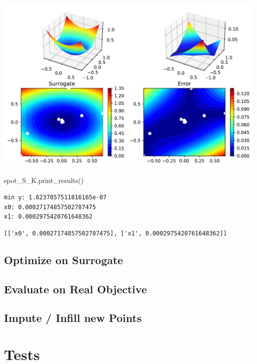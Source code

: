 \documentclass[
  letterpaper,
  DIV=11,
  numbers=noendperiod]{scrreprt}
\newenvironment{Shaded}{\begin{snugshade}}{\end{snugshade}}
\newcommand{\NormalTok}[1]{\textcolor[rgb]{0.00,0.23,0.31}{#1}}
\begin{document}
\includegraphics{012_num_spot_ei_files/figure-pdf/cell-40-output-1.pdf}

\begin{Shaded}
\begin{Highlighting}[]
\NormalTok{spot\_S\_K.print\_results()}
\end{Highlighting}
\end{Shaded}

\begin{verbatim}
min y: 1.6237857511816165e-07
x0: 0.00027174857502787475
x1: 0.0002975420761648362
\end{verbatim}

\begin{verbatim}
[['x0', 0.00027174857502787475], ['x1', 0.0002975420761648362]]
\end{verbatim}

\subsection{Optimize on Surrogate}\label{optimize-on-surrogate}

\subsection{Evaluate on Real
Objective}\label{evaluate-on-real-objective}

\subsection{Impute / Infill new Points}\label{impute-infill-new-points}

\section{Tests}\label{tests}
\end{document}
